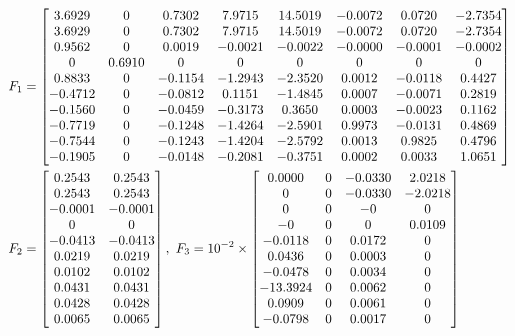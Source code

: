 {\scriptsize 
\begin{align*}
& F_1  = \left[\begin{matrix}
3.6929   &      0  &  0.7302  &  7.9715 &  14.5019 &   -0.0072 &
0.0720 &   -2.7354\\
    3.6929   &      0  &  0.7302  &  7.9715 &  14.5019 &  -0.0072  &  0.0720  & -2.7354\\
    0.9562    &     0  &  0.0019 &  -0.0021 &  -0.0022 &   -0.0000 &  -0.0001 &  -0.0002\\
         0 &   0.6910    &     0    &     0  &       0     &    0   &      0    &     0\\
    0.8833     &    0  & -0.1154 &  -1.2943 &  -2.3520  &  0.0012 &  -0.0118  &  0.4427\\
   -0.4712    &     0 &  -0.0812 &    0.1151  & -1.4845  &  0.0007 &  -0.0071  &  0.2819\\
   -0.1560     &    0 &  -0.0459 &  -0.3173  &  0.3650  &  0.0003  & -0.0023  &  0.1162\\
   -0.7719   &      0 &  -0.1248  & -1.4264 &  -2.5901  &  0.9973 &  -0.0131  &  0.4869\\
   -0.7544  &       0  & -0.1243 &  -1.4204 &  -2.5792  &  0.0013 &   0.9825 &   0.4796\\
   -0.1905   &      0  & -0.0148  & -0.2081 &  -0.3751  &  0.0002  &  0.0033  &  1.0651
\end{matrix}\right]\\
& F_2 = \left[\begin{matrix}
0.2543  &  0.2543\\
    0.2543  &  0.2543\\
   -0.0001 &  -0.0001\\
         0 &        0\\
   -0.0413 &  -0.0413\\
    0.0219  &  0.0219\\
    0.0102 &   0.0102\\
    0.0431 &   0.0431\\
    0.0428 &   0.0428\\
    0.0065 &   0.0065\\
\end{matrix}\right],
~F_3 = 10^{-2}\times\left[\begin{matrix}
 0.0000    &     0  & -0.0330 &   2.0218\\
    0   &      0  & -0.0330 &  -2.0218\\
    0  &       0 &   -0  &  0\\
   -0  &       0  &  0 &   0.0109\\
   -0.0118 &        0  &  0.0172  &  0 \\
    0.0436  &       0 &   0.0003 &  0 \\
   -0.0478   &      0  &  0.0034 &   0 \\
  -13.3924 &        0 &   0.0062 &   0 \\
    0.0909     &    0  &  0.0061 &  0\\
   -0.0798  &       0 &   0.0017  &  0\\
\end{matrix}\right]
\end{align*}}

